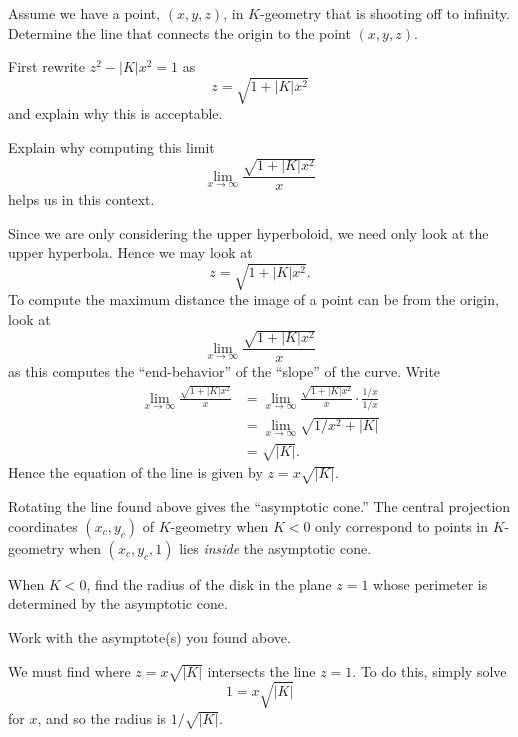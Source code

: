 \documentclass{ximera}
\begin{document}
\begin{problem}
  Assume we have a point, $(x, y, z)$, in $K$-geometry that is shooting off to
  infinity. Determine the line that connects the origin to the point $(x, y, z)$.  \begin{hint}
    First rewrite $z^{2}-|K|x^{2} =1$ as
    \[
    z = \sqrt{1+|K|x^2}
    \]
    and explain why this is acceptable.
  \end{hint}
  \begin{hint}
    Explain why computing this limit
    \[
    \lim_{x\to \infty} \frac{\sqrt{1+|K|x^2}}{x}
    \]
    helps us in this context.
  \end{hint}
  \begin{freeResponse}
    Since we are only considering the upper hyperboloid, we need only
    look at the upper hyperbola. Hence we may look at
     \[
    z = \sqrt{1+|K|x^2}.
    \]
    To compute the maximum distance the image of a point can be from
    the origin, look at 
    \[
    \lim_{x\to \infty} \frac{\sqrt{1+|K|x^2}}{x}
    \]
    as this computes the ``end-behavior'' of the ``slope'' of the
    curve. Write
    \begin{align*}
      \lim_{x\to \infty} \frac{\sqrt{1+|K|x^2}}{x} &= \lim_{x\to \infty} \frac{\sqrt{1+|K|x^2}}{x}\cdot \frac{1/x}{1/x}\\
      &= \lim_{x\to \infty} \sqrt{1/x^2+|K|}\\
      &= \sqrt{|K|}.
    \end{align*}
    Hence the equation of the line is given by $z = x\sqrt{|K|}$.
  \end{freeResponse}
\end{problem}


Rotating the line found above gives the ``asymptotic cone.'' The
central projection coordinates $(x_{c},y_{c})$ of $K$-geometry when
$K<0$ only correspond to points in $K$-geometry when $(x_{c},y_{c},1)$
lies \textit{inside} the asymptotic cone.

\begin{problem}
  When $K<0$, find the radius of the disk in the plane $z=1$ whose
  perimeter is determined by the asymptotic cone. 
  \begin{hint}
    Work with the asymptote(s) you found above.
  \end{hint}
  \begin{freeResponse}
    We must find where $z = x\sqrt{|K|}$ intersects the line $z=1$. To do this, simply solve
    \[
    1 = x\sqrt{|K|}
    \]
    for $x$, and so the radius is $1/\sqrt{|K|}$.
  \end{freeResponse}
\end{problem}
\end{document}
